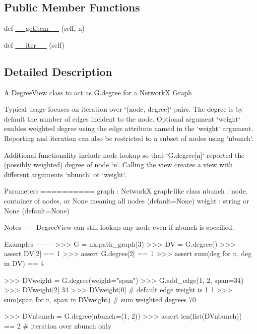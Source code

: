 \subsection*{Public Member Functions}
\begin{DoxyCompactItemize}
\item 
def \hyperlink{classnetworkx_1_1classes_1_1reportviews_1_1DegreeView_a873e548075b9ff7d7ec1378f9f764064}{\+\_\+\+\_\+getitem\+\_\+\+\_\+} (self, n)
\item 
def \hyperlink{classnetworkx_1_1classes_1_1reportviews_1_1DegreeView_af063bebbf55f1b0f64a0e20e1dfc9aea}{\+\_\+\+\_\+iter\+\_\+\+\_\+} (self)
\end{DoxyCompactItemize}


\subsection{Detailed Description}
\begin{DoxyVerb}A DegreeView class to act as G.degree for a NetworkX Graph

Typical usage focuses on iteration over `(node, degree)` pairs.
The degree is by default the number of edges incident to the node.
Optional argument `weight` enables weighted degree using the edge
attribute named in the `weight` argument.  Reporting and iteration
can also be restricted to a subset of nodes using `nbunch`.

Additional functionality include node lookup so that `G.degree[n]`
reported the (possibly weighted) degree of node `n`. Calling the
view creates a view with different arguments `nbunch` or `weight`.

Parameters
==========
graph : NetworkX graph-like class
nbunch : node, container of nodes, or None meaning all nodes (default=None)
weight : string or None (default=None)

Notes
-----
DegreeView can still lookup any node even if nbunch is specified.

Examples
--------
>>> G = nx.path_graph(3)
>>> DV = G.degree()
>>> assert DV[2] == 1
>>> assert G.degree[2] == 1
>>> assert sum(deg for n, deg in DV) == 4

>>> DVweight = G.degree(weight="span")
>>> G.add_edge(1, 2, span=34)
>>> DVweight[2]
34
>>> DVweight[0]  #  default edge weight is 1
1
>>> sum(span for n, span in DVweight)  # sum weighted degrees
70

>>> DVnbunch = G.degree(nbunch=(1, 2))
>>> assert len(list(DVnbunch)) == 2  # iteration over nbunch only
\end{DoxyVerb}
 

